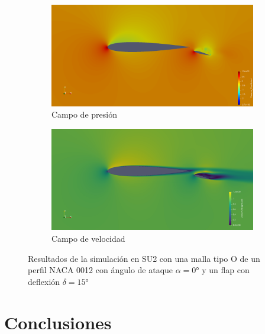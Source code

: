 \documentclass[letterpaper, openright, 12pt]{book}
\begin{document}
    \begin{figure}[htbp!]
        \centering
        \begin{subfigure}[c]{0.48\textwidth}
            \includegraphics[keepaspectratio, width=0.99\textwidth]
                {./img/su2/mo_flap_cp_alfa_0}
            \caption{Campo de presión}
            \label{fig:mo_flap_cp_0}
        \end{subfigure}
        \begin{subfigure}[c]{0.48\textwidth}
            \includegraphics[keepaspectratio, width=0.99\textwidth]
                {./img/su2/mo_flap_vel_alfa_0}
            \caption{Campo de velocidad}
            \label{fig:mo_flap_vel_0}
        \end{subfigure}
        \caption[Resultados de simaluciones para malla O con perfil y
            flap]{Resultados de la simulación en SU2 con una malla tipo O de un
            perfil NACA 0012 con ángulo de ataque $\alpha = 0\si{\degree}$ y un
            flap con deflexión $\delta = 15\si{\degree}$}
        \label{fig:mo_flap_su2_0}
    \end{figure}

%
%
%
%
%

%
%
%
%
%
\chapter{Conclusiones}
\end{document}
